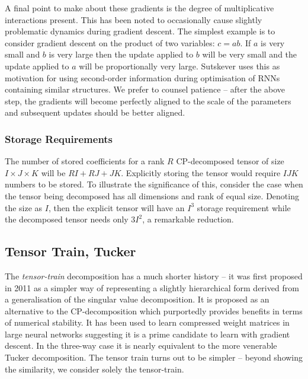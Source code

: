 {A final point to make about these gradients is the degree of multiplicative interactions present.
This has been noted to occasionally cause slightly problematic dynamics during gradient descent. The
simplest example is to consider
gradient descent on the product of two variables: \(c = ab\). If \(a\) is very small and \(b\) is
very large then the update applied to \(b\) will be very small and the update applied to \(a\) will
be proportionally very large. Sutskever \autocite{Sutskever2013} uses this as motivation for using
second-order information during optimisation of RNNs containing similar structures. We prefer to
counsel patience -- after the above step, the gradients will become perfectly aligned to the scale
of the parameters and subsequent updates should be better aligned.


\subsubsection{Storage Requirements}
The number of stored coefficients for a rank \(R\) CP-decomposed tensor of size 
\(I \times J \times K\) will be \(RI + RJ + JK\). Explicitly storing the tensor would require
\(IJK\) numbers to be stored. To illustrate the significance of this, consider the case when
the tensor being decomposed has all dimensions and rank of equal size. Denoting the size as
\(I\), then the explicit tensor will have an \(I^3\) storage requirement while the decomposed
tensor needs only \(3I^2\), a remarkable reduction.


\subsection{Tensor Train, Tucker}
The \emph{tensor-train} decomposition has a much shorter history -- it was first proposed in
2011 as a simpler way of representing a slightly hierarchical form derived from a
generalisation of the singular value decomposition. \autocite{Osedelets2011} It is proposed
as an alternative to the CP-decomposition which purportedly provides benefits in terms of
numerical stability. It has been used to learn compressed weight matrices in large neural
networks \autocite{Novikov} suggesting it is a prime candidate to learn with gradient descent.
In the three-way case it is nearly equivalent to the more venerable Tucker 
decomposition. \autocite{Tucker1966} The tensor train turns out to be simpler -- beyond showing the
similarity, we consider solely the tensor-train.

}
